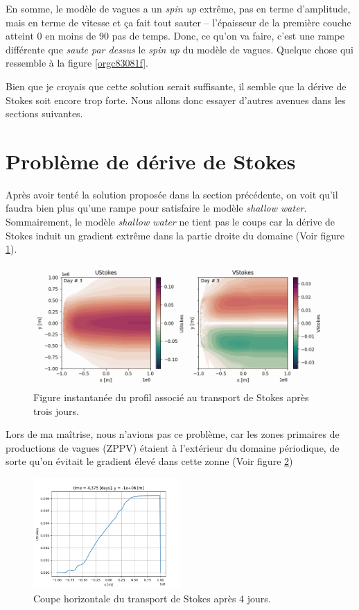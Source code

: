 \documentclass[10pt]{article}
\numberwithin{equation}{section}
\begin{document}
En somme, le modèle de vagues a un \emph{spin up} extrême, pas en terme d'amplitude, mais en terme de vitesse et ça fait tout sauter -- l'épaisseur de la première couche atteint 0 en moins de 90 pas de temps.
Donc, ce qu'on va faire, c'est une rampe différente que \emph{saute par dessus} le \emph{spin up} du modèle de vagues.
Quelque chose qui ressemble à la figure \ref{orgc83081f}. \bigskip

Bien que je croyais que cette solution serait suffisante, il semble que la dérive de Stokes soit encore trop forte.
Nous allons donc essayer d'autres avenues dans les sections suivantes. 

\section{Problème de dérive de Stokes}
\label{sec:orgfe7dfba}
Après avoir tenté la solution proposée dans la section précédente, on voit qu'il faudra bien plus qu'une rampe pour satisfaire le modèle \emph{shallow water}.
Sommairement, le modèle \emph{shallow water} ne tient pas le coups car la dérive de Stokes induit un gradient extrême dans la partie droite du domaine (Voir figure \ref{fig:org0f519be}).

\begin{figure}[htbp]
\centering
\includegraphics[width=.9\linewidth]{figures/debuggage/2023_10_13_UStokes.png}
\caption{\label{fig:org0f519be}Figure instantanée du profil associé au transport de Stokes après trois jours.}
\end{figure}

Lors de ma maîtrise, nous n'avions pas ce problème, car les zones primaires de productions de vagues (ZPPV) étaient à l'extérieur du domaine périodique, de sorte qu'on évitait le gradient élevé dans cette zonne (Voir figure \ref{fig:org7de0562})

\begin{figure}[!htpb]
\centering
\includegraphics[width=0.5\textwidth]{figures/debuggage/2023_10_13_Stokes_coupe.png}
\caption{\label{fig:org7de0562}Coupe horizontale du transport de Stokes après 4 jours.}
\end{figure}
\end{document}
